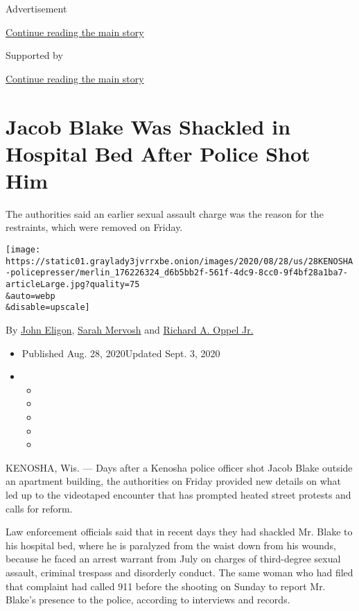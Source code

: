 Advertisement

\protect\hyperlink{after-top}{Continue reading the main story}

Supported by

\protect\hyperlink{after-sponsor}{Continue reading the main story}

\hypertarget{jacob-blake-was-shackled-in-hospital-bed-after-police-shot-him}{%
\section{Jacob Blake Was Shackled in Hospital Bed After Police Shot
Him}\label{jacob-blake-was-shackled-in-hospital-bed-after-police-shot-him}}

The authorities said an earlier sexual assault charge was the reason for
the restraints, which were removed on Friday.

\texttt{[image: https://static01.graylady3jvrrxbe.onion/images/2020/08/28/us/28KENOSHA-policepresser/merlin\_176226324\_d6b5bb2f-561f-4dc9-8cc0-9f4bf28a1ba7-articleLarge.jpg?quality=75\\\&auto=webp\\\&disable=upscale]}

By \href{https://www.nytimes3xbfgragh.onion/by/john-eligon}{John
Eligon},
\href{https://www.nytimes3xbfgragh.onion/by/sarah-mervosh}{Sarah
Mervosh} and
\href{https://www.nytimes3xbfgragh.onion/by/richard-a-oppel-jr}{Richard
A. Oppel Jr.}

\begin{itemize}
\item
  Published Aug. 28, 2020Updated Sept. 3, 2020
\item
  \begin{itemize}
  \item
  \item
  \item
  \item
  \item
  \end{itemize}
\end{itemize}

KENOSHA, Wis. --- Days after a Kenosha police officer shot Jacob Blake
outside an apartment building, the authorities on Friday provided new
details on what led up to the videotaped encounter that has prompted
heated street protests and calls for reform.

Law enforcement officials said that in recent days they had shackled Mr.
Blake to his hospital bed, where he is paralyzed from the waist down
from his wounds, because he faced an arrest warrant from July on charges
of third-degree sexual assault, criminal trespass and disorderly
conduct. The same woman who had filed that complaint had called 911
before the shooting on Sunday to report Mr. Blake's presence to the
police, according to interviews and records.

